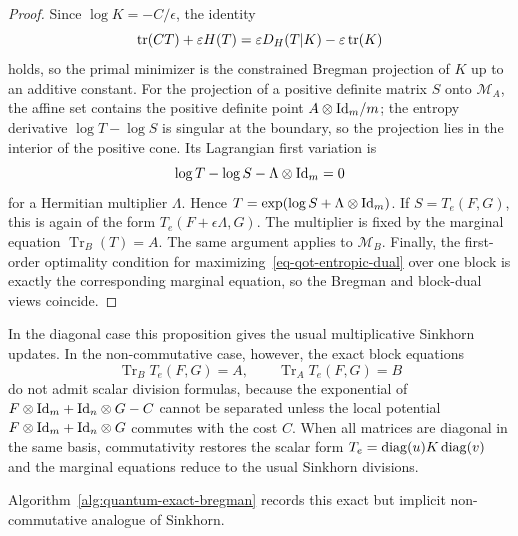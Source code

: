 \begin{proof}
	Since $\log K=-C/\epsilon$, the identity
	\[
		\operatorname{tr}(CT)+\varepsilon H(T)
		=
		\varepsilon D_H(T|K)-\varepsilon\operatorname{tr}(K)
	\]
	holds, so the primal minimizer is the constrained Bregman projection of $K$ up to an additive constant. For the projection of a positive definite matrix $S$ onto $\mathcal M_A$, the affine set contains the positive definite point $A\otimes\mathrm{Id}_m/m$; the entropy derivative $\log T-\log S$ is singular at the boundary, so the projection lies in the interior of the positive cone. Its Lagrangian first variation is
	\[
		\log T-\log S-\Lambda\otimes\mathrm{Id}_m=0
	\]
	for a Hermitian multiplier $\Lambda$. Hence $T=\exp(\log S+\Lambda\otimes\mathrm{Id}_m)$. If $S=T_e(F,G)$, this is again of the form $T_e(F+\epsilon\Lambda,G)$. The multiplier is fixed by the marginal equation $\operatorname{Tr}_B(T)=A$. The same argument applies to $\mathcal M_B$. Finally, the first-order optimality condition for maximizing~\eqref{eq-qot-entropic-dual} over one block is exactly the corresponding marginal equation, so the Bregman and block-dual views coincide.
\end{proof}

In the diagonal case this proposition gives the usual multiplicative Sinkhorn updates. In the non-commutative case, however, the exact block equations
\[
	\operatorname{Tr}_B T_e(F,G)=A,
	\qquad
	\operatorname{Tr}_A T_e(F,G)=B
\]
do not admit scalar division formulas, because the exponential of $F\otimes\mathrm{Id}_m+\mathrm{Id}_n\otimes G-C$ cannot be separated unless the local potential $F\otimes\mathrm{Id}_m+\mathrm{Id}_n\otimes G$ commutes with the cost $C$.
When all matrices are diagonal in the same basis, commutativity restores the scalar form $T_e=\operatorname{diag}(u)K\operatorname{diag}(v)$ and the marginal equations reduce to the usual Sinkhorn divisions.

Algorithm~\ref{alg:quantum-exact-bregman} records this exact but implicit non-commutative analogue of Sinkhorn.

